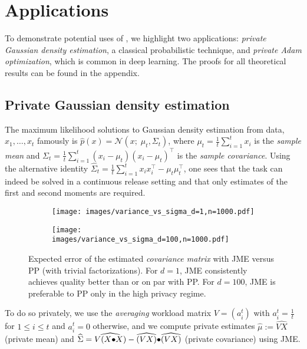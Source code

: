 \section{Applications}
\label{sec:applications}
To demonstrate potential uses of \acronym, we highlight two applications:
\emph{private Gaussian density estimation}, a classical probabilistic 
technique, and \emph{private Adam optimization}, which is  common in deep 
learning.
%
The proofs for all theoretical results can be found in the appendix.

\subsection{Private Gaussian density estimation}
The maximum likelihood solutions to Gaussian density estimation from \iid data,
$x_1,\dots,x_t$ famously is $\widehat p(x) = \mathcal{N}(x;\;\mu_t,\Sigma_t)$, where 
$\mu_t=\frac{1}{t}\sum_{i=1}^t x_i$ is the \emph{sample mean} and 
$\Sigma_t=\frac{1}{t}\sum_{i=1}^t (x_i-\mu_t)(x_i-\mu_t)^\top$
is the \emph{sample covariance}.
%
Using the alternative identity $\widehat\Sigma_t=\frac{1}{t}\sum_{i=1}^t x_ix^\top_i-\mu_t\mu^{\top}_t$,
one sees that the task can indeed be solved in a continuous release setting and 
that only estimates of the first and second moments are required.

\begin{figure}[t]
    \centering\scriptsize
    \begin{subfigure}[c]{.48\linewidth}\scriptsize
        \texttt{[image: images/variance\_vs\_sigma\_d=1,n=1000.pdf]}
    \end{subfigure}
    \begin{subfigure}[c]{0.48\linewidth}
        \texttt{[image: images/variance\_vs\_sigma\_d=100,n=1000.pdf]}
    \end{subfigure}
    \caption{Expected error of the estimated \emph{covariance matrix} with JME versus PP
    (with trivial factorizations). For $d=1$, JME consistently achieves quality better 
    than or on par with PP. 
    For $d=100$, JME is preferable to PP only in the high privacy regime.
    }
    \label{fig:covariance_error}
\end{figure}



To do so privately, we use the \emph{averaging} workload matrix $V=(a^t_i)$ with $a^t_i=\frac{1}{t}$ for $1\leq i\leq t$ and $a^t_i=0$ otherwise, and we compute private estimates $\widehat\mu := \widehat{VX}$ (private mean) and $\widehat\Sigma=\widehat{V(X\operatorname{\!\bullet\!} X)} - \widehat{(VX)}\operatorname{\!\bullet\!} \widehat{(VX)}$ (private covariance) using JME. 

